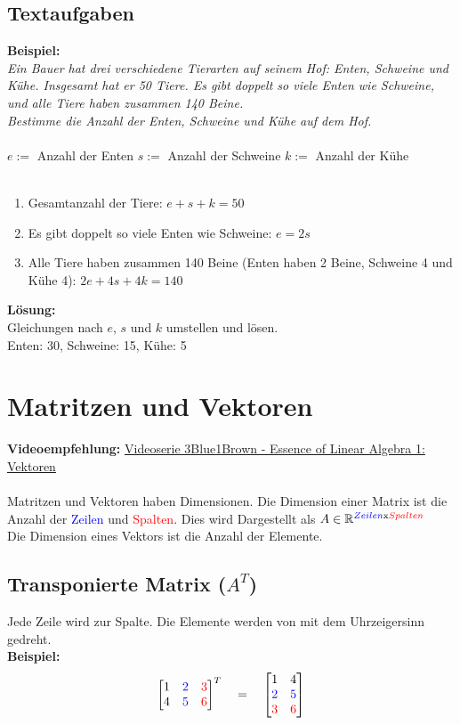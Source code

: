 \documentclass[12pt,a4paper]{article}
\begin{document}
\subsection{Textaufgaben}
\textbf{Beispiel:} \\
\textit{Ein Bauer hat drei verschiedene Tierarten auf seinem Hof: Enten, Schweine und Kühe.
Insgesamt hat er 50 Tiere. Es gibt doppelt so viele Enten wie Schweine, und alle Tiere haben zusammen 140 Beine. \\
Bestimme die Anzahl der Enten, Schweine und Kühe auf dem Hof.} \\ \\
$e :=$ Anzahl der Enten
$s :=$ Anzahl der Schweine
$k :=$ Anzahl der Kühe \\ \\
\begin{enumerate}
\item Gesamtanzahl der Tiere: $e + s + k = 50$
\item Es gibt doppelt so viele Enten wie Schweine: $e = 2s$
\item Alle Tiere haben zusammen 140 Beine (Enten haben 2 Beine, Schweine 4 und Kühe 4): $2e + 4s + 4k = 140$
\end{enumerate}
\textbf{Lösung:} \\
Gleichungen nach $e$, $s$ und $k$ umstellen und lösen. \\
Enten: 30, Schweine: 15, Kühe: 5



\section{Matritzen und Vektoren}
\textbf{Videoempfehlung:} \href{https://www.youtube.com/watch?v=fNk_zzaMoSs}{Videoserie 3Blue1Brown - Essence of Linear Algebra 1: Vektoren} \\ \\
Matritzen und Vektoren haben Dimensionen. Die Dimension einer Matrix ist die Anzahl der \textcolor{blue}{Zeilen} und \textcolor{red}{Spalten}. Dies wird Dargestellt als $A \in \mathbb{R}^{\textcolor{blue}{Zeilen}\text{x}\textcolor{red}{Spalten}}$\\ Die Dimension eines Vektors ist die Anzahl der Elemente. \\
\subsection{Transponierte Matrix (\texorpdfstring{$A^T$}{A^T})}
Jede Zeile wird zur Spalte. Die Elemente werden von mit dem Uhrzeigersinn gedreht. \\
\textbf{Beispiel:}
\[
\begin{bmatrix}
1 & \textcolor{blue}{2} & \textcolor{red}{3} \\
4 & \textcolor{blue}{5} & \textcolor{red}{6}
\end{bmatrix}^T
\quad
=
\quad
\begin{bmatrix}
    1 & 4 \\
    \textcolor{blue}{2} & \textcolor{blue}{5} \\
    \textcolor{red}{3} & \textcolor{red}{6}
\end{bmatrix}
\]
\end{document}
